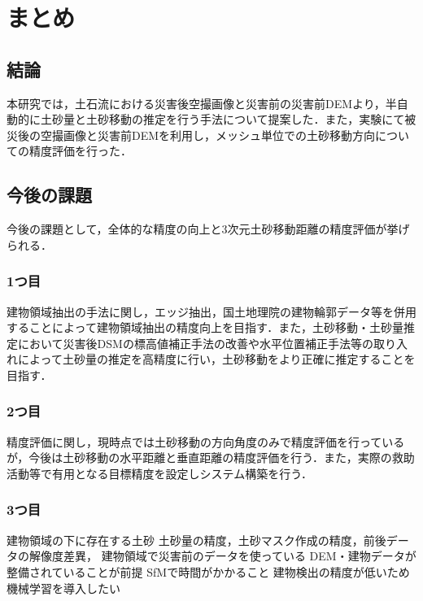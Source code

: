 \chapter{まとめ}
  \section{結論}
    本研究では，土石流における災害後空撮画像と災害前の災害前DEMより，半自動的に土砂量と土砂移動の推定を行う手法について提案した．また，実験にて被災後の空撮画像と災害前DEMを利用し，メッシュ単位での土砂移動方向についての精度評価を行った．



  \section{今後の課題}
    今後の課題として，全体的な精度の向上と3次元土砂移動距離の精度評価が挙げられる．


    \subsection{1つ目}
      建物領域抽出の手法に関し，エッジ抽出，国土地理院の建物輪郭データ等を併用することによって建物領域抽出の精度向上を目指す．また，土砂移動・土砂量推定において災害後DSMの標高値補正手法の改善や水平位置補正手法\cite{土砂量解析1}等の取り入れによって土砂量の推定を高精度に行い，土砂移動をより正確に推定することを目指す．


    \subsection{2つ目}
      精度評価に関し，現時点では土砂移動の方向角度のみで精度評価を行っているが，今後は土砂移動の水平距離と垂直距離の精度評価を行う．また，実際の救助活動等で有用となる目標精度を設定しシステム構築を行う．

      
    \subsection{3つ目}
      建物領域の下に存在する土砂
      土砂量の精度，土砂マスク作成の精度，前後データの解像度差異，
      建物領域で災害前のデータを使っている
      DEM・建物データが整備されていることが前提
      SfMで時間がかかること
      建物検出の精度が低いため機械学習を導入したい
